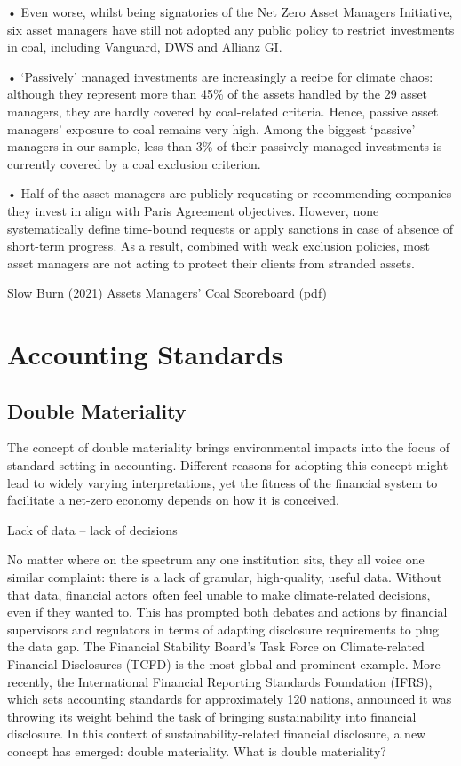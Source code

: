 \documentclass[
]{book}
\begin{document}
• Even worse, whilst being signatories of the Net Zero Asset Managers
Initiative, six asset managers have still not adopted any public policy to
restrict investments in coal, including Vanguard, DWS and Allianz GI.

• `Passively' managed investments are increasingly a recipe for climate
chaos: although they represent more than 45\% of the assets handled by the
29 asset managers, they are hardly covered by coal-related criteria. Hence,
passive asset managers' exposure to coal remains very high. Among the
biggest `passive' managers in our sample, less than 3\% of their passively
managed investments is currently covered by a coal exclusion criterion.

• Half of the asset managers are publicly requesting or recommending
companies they invest in align with Paris Agreement objectives. However,
none systematically define time-bound requests or apply sanctions in case
of absence of short-term progress. As a result, combined with weak exclusion
policies, most asset managers are not acting to protect their clients from
stranded assets.

\href{pdf/SlowBurn_2021_Coal_Scoreboard.pdf}{Slow Burn (2021) Assets Managers' Coal Scoreboard (pdf)}

\hypertarget{accounting-standards}{%
\section{Accounting Standards}\label{accounting-standards}}

\hypertarget{double-materiality}{%
\subsection{Double Materiality}\label{double-materiality}}

The concept of double materiality brings environmental impacts into the focus of standard-setting in accounting. Different reasons for adopting this concept might lead to widely varying interpretations, yet the fitness of the financial system to facilitate a net-zero economy depends on how it is conceived.

Lack of data -- lack of decisions

No matter where on the spectrum any one institution sits, they all voice one similar complaint: there is a lack of granular, high-quality, useful data. Without that data, financial actors often feel unable to make climate-related decisions, even if they wanted to. This has prompted both debates and actions by financial supervisors and regulators in terms of adapting disclosure requirements to plug the data gap. The Financial Stability Board's Task Force on Climate-related Financial Disclosures (TCFD) is the most global and prominent example. More recently, the International Financial Reporting Standards Foundation (IFRS), which sets accounting standards for approximately 120 nations, announced it was throwing its weight behind the task of bringing sustainability into financial disclosure. In this context of sustainability-related financial disclosure, a new concept has emerged: double materiality.
What is double materiality?
\end{document}
